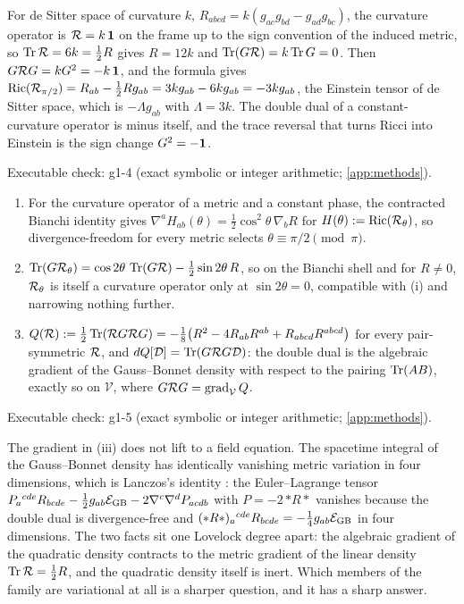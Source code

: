 \begin{example}
\label{ex:dS}
For de Sitter space of curvature $k$, $R_{abcd}=k(g_{ac}g_{bd}-g_{ad}g_{bc})$, the curvature operator is $\mathcal R=k\,\mathbf 1$ on the frame up to the sign convention of the
induced metric, so $\operatorname{Tr}\mathcal R=6k=\tfrac12R$ gives $R=12k$ and $\operatorname{Tr}(G\mathcal R)=k\operatorname{Tr} G=0$. Then $G\mathcal R G=kG^2=-k\,\mathbf 1$, and the formula gives
$\operatorname{Ric}(\mathcal R_{\pi/2})=R_{ab}-\tfrac12Rg_{ab}=3kg_{ab}-6kg_{ab}=-3kg_{ab}$, the Einstein tensor of de Sitter space, which is $-\Lambda g_{ab}$ with $\Lambda=3k$. The double
dual of a constant-curvature operator is minus itself, and the trace reversal that turns Ricci into Einstein is the sign change $G^2=-\mathbf 1$.
\end{example}

\noindent Executable check: g1-4 (exact symbolic or integer arithmetic; \cref{app:methods}).

\begin{corollary}
\label{cor:phasesel}
\begin{enumerate}[label=(\roman*),leftmargin=2.2em]
\item For the curvature operator of a metric and a constant phase, the contracted Bianchi identity gives $\nabla^aH_{ab}(\theta)=\tfrac12\cos^2\theta\,\nabla_bR$ for
$H(\theta):=\operatorname{Ric}(\mathcal R_\theta)$, so divergence-freedom for every metric selects $\theta\equiv\pi/2\pmod\pi$.
\item $\operatorname{Tr}(G\mathcal R_\theta)=\cos2\theta\,\operatorname{Tr}(G\mathcal R)-\tfrac12\sin2\theta\,R$, so on the Bianchi shell and for $R\neq0$, $\mathcal R_\theta$ is itself a curvature operator only at
$\sin2\theta=0$, compatible with (i) and narrowing nothing further.
\item $Q(\mathcal R):=\tfrac12\operatorname{Tr}(\mathcal R G\mathcal R G)=-\tfrac18\bigl(R^2-4R_{ab}R^{ab}+R_{abcd}R^{abcd}\bigr)$ for every pair-symmetric $\mathcal R$, and $dQ[\mathcal D]=\operatorname{Tr}(G\mathcal R G\mathcal D)$: the
double dual is the algebraic gradient of the Gauss--Bonnet density with respect to the pairing $\operatorname{Tr}(AB)$, exactly so on $\mathcal V$, where
$G\mathcal R G=\operatorname{grad}_{\mathcal V}Q$.
\end{enumerate}
\end{corollary}

\noindent Executable check: g1-5 (exact symbolic or integer arithmetic; \cref{app:methods}).

The gradient in (iii) does not lift to a field equation. The spacetime integral of the Gauss--Bonnet density has identically vanishing metric variation in four
dimensions, which is Lanczos's identity \cite{Lanczos38,Lovelock71}: the Euler--Lagrange tensor $P_a{}^{cde}R_{bcde}-\tfrac12g_{ab}\mathcal E_{\rm GB}-2\nabla^c\nabla^dP_{acdb}$ with
$P=-2\,{*R*}$ vanishes because the double dual is divergence-free and $(*R*)_a{}^{cde}R_{bcde}=-\tfrac14g_{ab}\mathcal E_{\rm GB}$ in four dimensions. The two facts sit one
Lovelock degree apart: the algebraic gradient of the quadratic density contracts to the metric gradient of the linear density $\operatorname{Tr}\mathcal R=\tfrac12R$, and the quadratic
density itself is inert. Which members of the family are variational at all is a sharper question, and it has a sharp answer.

